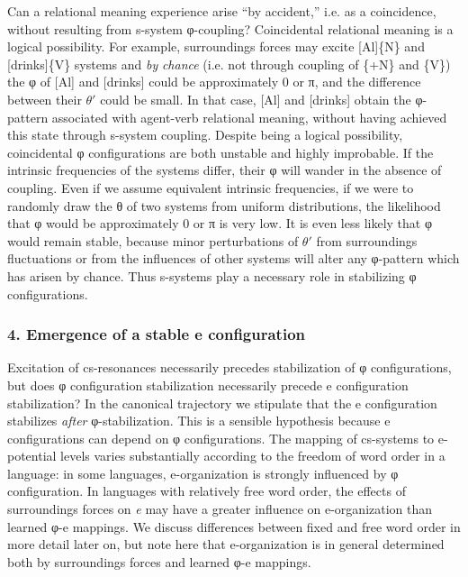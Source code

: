   Can a relational meaning experience arise “by accident,” i.e. as a coincidence, without resulting from s-system φ-coupling? Coincidental relational meaning is a logical possibility. For example, surroundings forces may excite [Al]\{N\} and [drinks]\{V\} systems and \textit{by} \textit{chance} (i.e. not through coupling of \{+N\} and \{V\}) the φ of [Al] and [drinks] could be approximately 0 or π, and the difference between their $\theta ′$ could be small. In that case, [Al] and [drinks] obtain the φ-pattern associated with agent-verb relational meaning, without having achieved this state through s-system coupling. Despite being a logical possibility, coincidental φ configurations are both unstable and highly improbable. If the intrinsic frequencies of the systems differ, their φ will wander in the absence of coupling. Even if we assume equivalent intrinsic frequencies, if we were to randomly draw the θ of two systems from uniform distributions, the likelihood that φ would be approximately 0 or π is very low. It is even less likely that φ would remain stable, because minor perturbations of $\theta ′$ from surroundings fluctuations or from the influences of other systems will alter any φ-pattern which has arisen by chance. Thus s-systems play a necessary role in stabilizing φ configurations.

\subsubsection{4. Emergence of a stable e configuration}

Excitation of cs-resonances necessarily precedes stabilization of φ configurations, but does φ configuration stabilization necessarily precede e configuration stabilization? In the canonical trajectory we stipulate that the e configuration stabilizes \textit{after} φ-stabilization. This is a sensible hypothesis because e configurations can depend on φ configurations. The mapping of cs-systems to e-potential levels varies substantially according to the freedom of word order in a language: in some languages, e-organization is strongly influenced by φ configuration. In languages with relatively free word order, the effects of surroundings forces on \textit{e} may have a greater influence on e-organization than learned φ-e mappings. We discuss differences between fixed and  free word order in more detail later on, but note here that e-organization is in general determined both by surroundings forces and learned φ-e mappings.

